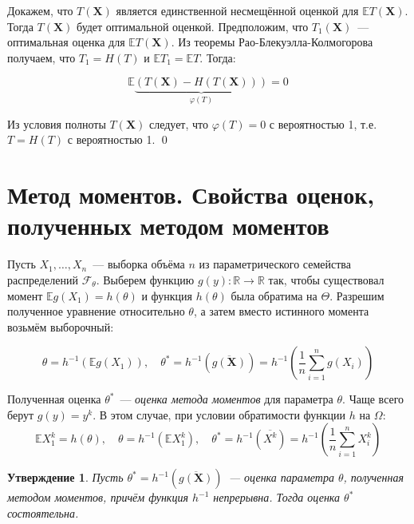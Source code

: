 \documentclass[oneside,final,14pt]{extreport}
\renewenvironment{proof}{{\bfseries Доказательство.}}{\qed}
\theoremstyle{plain}
\newtheorem*{thm*}{Утверждение}
\theoremstyle{definition}
\theoremstyle{named}
\begin{document}
\begin{proof}
Докажем, что $T(\mathbf{X})$ является единственной несмещённой оценкой для $\mathbb{E}T(\mathbf{X})$. Тогда $T(\mathbf{X})$ будет оптимальной оценкой. Предположим, что $T_1(\mathbf{X})$~--- оптимальная оценка для $\mathbb{E}T(\mathbf{X})$. Из теоремы Рао-Блекуэлла-Колмогорова получаем, что $T_{1}=H(T)$ и $\mathbb{E} T_{1}=\mathbb{E} T$. Тогда:

\begin{equation*}
    \mathbb{E} \underbrace{(T(\mathbf{X})-H(T(\mathbf{X})))}_{\varphi(T)}=0
\end{equation*}

Из условия полноты $T(\mathbf{X})$ следует, что $\varphi(T)=0$ с вероятностью 1, т.е. $T=H(T)$ с вероятностью 1.
\end{proof}

\section{Метод моментов. Свойства оценок, полученных методом моментов}

Пусть $X_1, \ldots, X_n$~--- выборка объёма $n$ из параметрического семейства распределений $\mathcal{F}_\theta$. Выберем функцию $g(y): \mathbb{R} \rightarrow \mathbb{R}$ так, чтобы существовал момент $\mathbb{E} g\left(X_{1}\right)=h(\theta)$ и функция $h(\theta)$ была обратима на $\Theta$. Разрешим полученное уравнение относительно $\theta$, а затем вместо истинного момента возьмём выборочный:

\begin{equation*}
    \theta=h^{-1}\left(\mathbb{E} g\left(X_{1}\right)\right), \quad \theta^{*}=h^{-1}(\overline{g(\mathbf{X})})=h^{-1}\left(\frac{1}{n} \sum\limits_{i=1}^{n} g\left(X_{i}\right)\right)
\end{equation*}

Полученная оценка $\theta^{*}$~--- {\it оценка метода моментов} для параметра $\theta$. Чаще всего берут $g(y)=y^{k}$. В этом случае, при условии обратимости функции $h$ на $\Omega$:
\begin{equation*}
    \mathbb{E} X_{1}^{k}=h(\theta), \quad \theta=h^{-1}\left(\mathbb{E} X_{1}^{k}\right), \quad \theta^{*}=h^{-1}(\overline{X^{k}})=h^{-1}\left(\frac{1}{n} \sum\limits_{i=1}^{n} X_{i}^{k}\right)
\end{equation*}

\begin{thm*}
Пусть $\theta^{*}=h^{-1}(\overline{g(\mathbf{X})})$~--- оценка параметра $\theta$, полученная методом моментов, причём функция $h^{-1}$ непрерывна. Тогда оценка $\theta^{*}$ состоятельна.
\end{thm*}
\end{document}
